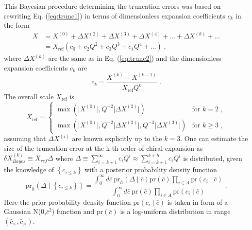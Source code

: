 This Bayesian procedure determining the truncation errors was based on rewriting Eq. (\ref{eq:trunc1}) in terms of dimensionless expansion coefficients $c_{k}$ in the form
\begin{equation}
\begin{split}
X &= X^{(0)} + \Delta X^{(2)}+ \Delta X^{(3)}+ \Delta X^{(4)}+\ldots + \Delta X^{(k)} +\ldots \\&= X_{\mathrm{ref}}\left(c_{0} + c_{2}Q^{2} + c_{3}Q^{3} + c_{4}Q^{4} + \ldots\right)\;,
\end{split}
\label{eq:trunc4}
\end{equation}
where $\Delta X^{(k)}$ are the same as in Eq. (\ref{eq:trunc2}) and the dimensionless expansion coefficients $c_{k}$ are
\begin{equation}
c_{k} = \frac{X^{(k)} - X^{(k-1)}}{X_{\mathrm{ref}}Q^{k}}\;.
\end{equation}
The overall scale $X_{\mathrm{ref}}$ is
\begin{equation}
  X_{\mathrm{ref}} =
  \begin{cases}
    \max\left(\vert X^{(0)}\vert, Q^{-2} \vert \Delta X^{(2)}\vert \right)  & \text{for $k = 2$}\;, \\
    \max\left(\vert X^{(0)}\vert, Q^{-2} \vert \Delta X^{(2)}\vert, Q^{-3} \vert \Delta X^{(3)}\vert \right) & \text{for $k \geq 3$}\;,
  \end{cases}
\label{eq:trunc5}
\end{equation}
assuming that $\Delta X^{(i)}$ are known explicitly up to the $k = 3$. One can estimate the size of the truncation error at the k-th order of chiral expansion as $\delta X^{(k)}_{Bayes} \equiv X_{ref}\Delta$ where 
$\Delta \equiv \sum^{\infty}_{i = k + 1}c_{i}Q^{i} \approx \sum^{k + h}_{i = k + 1}c_{i}Q^{i}$ is distributed, 
given the knowledge of $\left\lbrace c_{i \leq k}\right\rbrace$
with a posterior probability density function
\begin{equation}
\text{pr}_{h}\left(\Delta\mid \left\lbrace c_{i \leq k} \right\rbrace \right) = \frac{\int^{\infty}_{0}d\bar{c}~\text{pr}_{h}\left(\Delta\mid\bar{c} \right)\text{pr}(\bar{c})\prod_{i \in A}\text{pr}(c_{i}\mid\bar{c})}{\int^{\infty}_{0}d\bar{c}~\text{pr}(\bar{c})\prod_{i \in A}\text{pr}(c_{i}\mid\bar{c})}\;.
\label{eq_posterior1}
\end{equation}
Here the prior probability density function $\text{pr}(c_{i}\mid\bar{c})$ is taken in form of a Gaussian N(0,$\bar{c}^2$) function 
and $\text{pr}(\bar{c})$ is a log-uniform distribution in range $(\bar{c}_{<},\bar{c}_{>})$.
